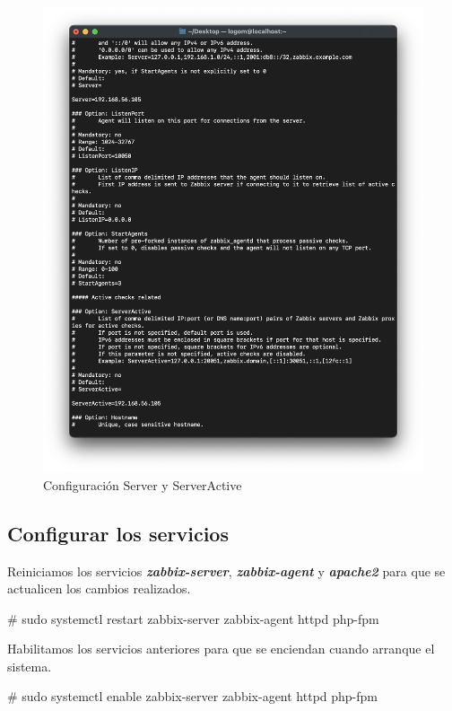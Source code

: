     \begin{figure}[H]
        \centering
        \includegraphics[scale=0.4]{images/centos_servers.png}
        \caption{Configuración Server y ServerActive}
        \label{fig:centos_servers}
    \end{figure}    

    \subsection{Configurar los servicios}
    Reiniciamos los servicios \textbf{\emph{zabbix-server}}, \textbf{\emph{zabbix-agent}} y \textbf{\emph{apache2}} para que se actualicen los cambios realizados.
        \begin{tcolorbox}[colback=black!10, halign=left]
            \# sudo systemctl restart zabbix-server zabbix-agent httpd php-fpm
        \end{tcolorbox}

    Habilitamos los servicios anteriores para que se enciendan cuando arranque el sistema.
        \begin{tcolorbox}[colback=black!10, halign=left]
            \# sudo systemctl enable zabbix-server zabbix-agent httpd php-fpm
        \end{tcolorbox}

